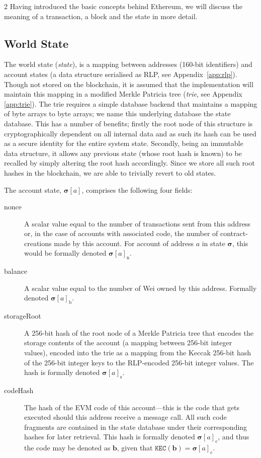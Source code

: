 \documentclass[9pt,oneside]{amsart}
\makeatletter
\newcommand{\linkdest}[1]{\Hy@raisedlink{\hypertarget{#1}{}}}
\makeatother
\begin{document}
\begin{multicols}{2}
Having introduced the basic concepts behind Ethereum, we will discuss the meaning of a transaction, a block and the state in more detail.

\subsection{World State} \label{ch:state}

The world state (\textit{state}), is a mapping between addresses (160-bit identifiers) and account states (a data structure serialised as RLP, see Appendix~\ref{app:rlp}). Though not stored on the blockchain, it is assumed that the implementation will maintain this mapping in a modified Merkle Patricia tree (\textit{trie}, see Appendix \ref{app:trie}). The trie requires a simple database backend that maintains a mapping of byte arrays to byte arrays; we name this underlying database the state database. This has a number of benefits; firstly the root node of this structure is cryptographically dependent on all internal data and as such its hash can be used as a secure identity for the entire system state. Secondly, being an immutable data structure, it allows any previous state (whose root hash is known) to be recalled by simply altering the root hash accordingly. Since we store all such root hashes in the blockchain, we are able to trivially revert to old states.

The account state, $\boldsymbol{\sigma}[a]$, comprises the following four fields:

\begin{description}
\item[nonce] \linkdest{account_nonce}A scalar value equal to the number of transactions sent from this address or, in the case of accounts with associated code, the number of contract-creations made by this account. For account of address $a$ in state $\boldsymbol{\sigma}$, this would be formally denoted $\boldsymbol{\sigma}[a]_{\mathrm{n}}$.
\item[balance] A scalar value equal to the number of Wei owned by this address. Formally denoted $\boldsymbol{\sigma}[a]_{\mathrm{b}}$.
\item[storageRoot] A 256-bit hash of the root node of a Merkle Patricia tree that encodes the storage contents of the account (a mapping between 256-bit integer values), encoded into the trie as a mapping from the Keccak 256-bit hash of the  256-bit integer keys to the RLP-encoded 256-bit integer values. The hash is formally denoted $\boldsymbol{\sigma}[a]_{\mathrm{s}}$.
\item[codeHash] The hash of the EVM code of this account---this is the code that gets executed should this address receive a message call. All such code fragments are contained in the state database under their corresponding hashes for later retrieval. This hash is formally denoted $\boldsymbol{\sigma}[a]_{\mathrm{c}}$, and thus the code may be denoted as $\mathbf{b}$, given that $\texttt{KEC}(\mathbf{b}) = \boldsymbol{\sigma}[a]_{\mathrm{c}}$.
\end{description}


\end{multicols}
\end{document}
